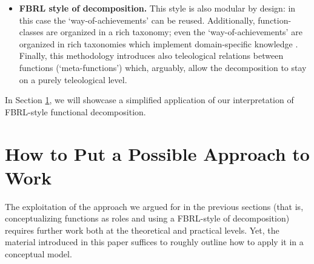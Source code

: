 \documentclass[
]{ceurart}
\begin{document}
\begin{itemize}
  \item \textbf{FBRL style of decomposition.} This style is also modular by design: in this case the `way-of-achievements' can be reused. Additionally, function-classes are organized in a rich taxonomy; even the `way-of-achievements' are organized in rich taxonomies which implement domain-specific knowledge \cite{kitamuraOntologybasedDescriptionFunctional2003}. Finally, this methodology introduces also teleological relations between functions (`meta-functions') which, arguably, allow the decomposition to stay on a purely teleological level. 
\end{itemize}
In Section \ref{sec:use-case}, we will showcase a simplified application of our interpretation of FBRL-style functional decomposition.


\section{How to Put a Possible Approach to Work}\label{sec:use-case}

The exploitation of the approach we argued for in the previous sections (that is, conceptualizing functions as roles and using a FBRL-style of decomposition) requires further work both at the theoretical and practical levels. Yet, the material introduced in this paper suffices to roughly outline how to apply it in a conceptual model.
\end{document}

